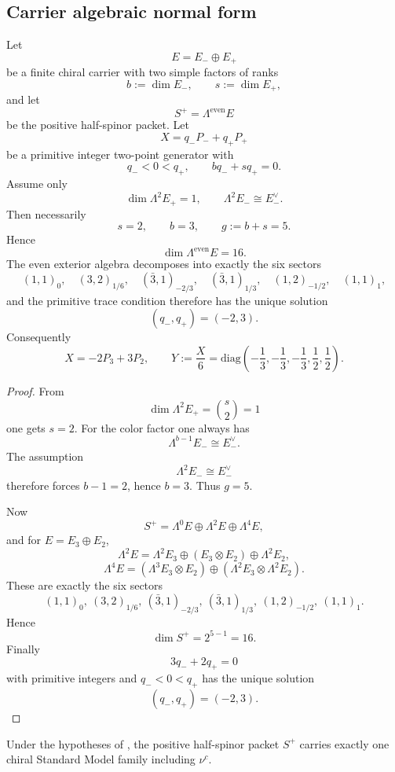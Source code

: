 \subsection{Carrier algebraic normal form}
\label{sec:minimal-carrier-proof}

\begin{lemma}
\label{thm:carrier-minimality-k}
\label{thm:carrier-minimality-kpp}
Let
\[
E=E_-\oplus E_+
\]
be a finite chiral carrier with two simple factors of ranks
\[
b:=\dim E_-,
\qquad
s:=\dim E_+,
\]
and let
\[
S^+=\Lambda^{\mathrm{even}}E
\]
be the positive half-spinor packet. Let
\[
X=q_-P_-+q_+P_+
\]
be a primitive integer two-point generator with
\[
q_-<0<q_+,
\qquad
bq_-+sq_+=0.
\]
Assume only
\[
\dim \Lambda^2 E_+=1,
\qquad
\Lambda^2 E_- \cong E_-^\vee.
\]
Then necessarily
\[
s=2,
\qquad
b=3,
\qquad
g:=b+s=5.
\]
Hence
\[
\dim \Lambda^{\mathrm{even}}E=16.
\]
The even exterior algebra decomposes into exactly the six sectors
\[
(1,1)_0,\quad
(3,2)_{1/6},\quad
(\bar 3,1)_{-2/3},\quad
(\bar 3,1)_{1/3},\quad
(1,2)_{-1/2},\quad
(1,1)_1,
\]
and the primitive trace condition therefore has the unique solution
\[
(q_-,q_+)=(-2,3).
\]
Consequently
\[
X=-2P_3+3P_2,
\qquad
Y:=\frac{X}{6}
=
\mathrm{diag}\!\left(-\frac13,-\frac13,-\frac13,\frac12,\frac12\right).
\]
\end{lemma}

\begin{proof}
From
\[
\dim\Lambda^2 E_+=\binom{s}{2}=1
\]
one gets $s=2$. For the color factor one always has
\[
\Lambda^{b-1}E_- \cong E_-^\vee.
\]
The assumption
\[
\Lambda^2E_- \cong E_-^\vee
\]
therefore forces $b-1=2$, hence $b=3$. Thus $g=5$.

Now
\[
S^+=\Lambda^0E\oplus\Lambda^2E\oplus\Lambda^4E,
\]
and for $E=E_3\oplus E_2$,
\[
\Lambda^2E
=
\Lambda^2E_3
\oplus
(E_3\otimes E_2)
\oplus
\Lambda^2E_2,
\]
\[
\Lambda^4E
=
(\Lambda^3E_3\otimes E_2)
\oplus
(\Lambda^2E_3\otimes \Lambda^2E_2).
\]
These are exactly the six sectors
\[
(1,1)_0,\ (3,2)_{1/6},\ (\bar 3,1)_{-2/3},\ (\bar 3,1)_{1/3},\ (1,2)_{-1/2},\ (1,1)_1.
\]
Hence
\[
\dim S^+=2^{5-1}=16.
\]
Finally
\[
3q_-+2q_+=0
\]
with primitive integers and $q_-<0<q_+$ has the unique solution
\[
(q_-,q_+)=(-2,3).
\]
\end{proof}

\begin{corollary}
Under the hypotheses of , the positive half-spinor packet $S^+$
carries exactly one chiral Standard Model family including $\nu^c$.
\end{corollary}

